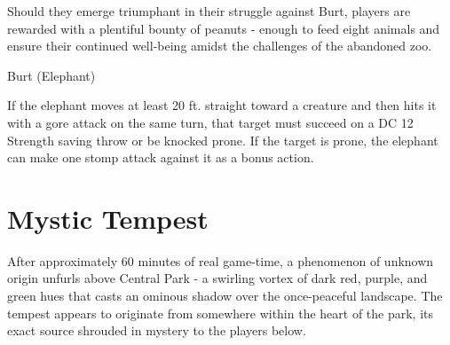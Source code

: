 Should they emerge triumphant in their struggle against Burt, players are rewarded with a plentiful bounty of peanuts - enough to feed eight animals and ensure their continued well-being amidst the challenges of the abandoned zoo.
\begin{DndMonster}[width=0.5\textwidth]{Burt (Elephant)}

	\DndMonsterBasics[
		armor-class = {15 (Natural Armor)},
		hit-points  = {\DndDice{10d12 + 30}},
		speed       = {40 ft.},
	]

	\renewcommand{\AbilityScoreSpacer}{~}

	\DndMonsterAbilityScores[
		str = 22,
		dex = 9,
		con = 17,
		int = 3,
		wis = 11,
		cha = 6,
	]

	\DndMonsterDetails[
		senses = {passive Perception 10},
		languages = {Common},
		challenge = 5,
	]

	If the elephant moves at least 20 ft. straight toward a creature and then hits it with a gore attack on the same turn, that target must succeed on a DC 12 Strength saving throw or be knocked prone. If the target is prone, the elephant can make one stomp attack against it as a bonus action.
	

	\DndMonsterAttack[
		name=Gore,
		distance=melee, %
		mod=+8,
		reach=5,
		targets=one target,
		dmg={\DndDice{3d8 + 6}},
		dmg-type=piercing,
	]
	
	\DndMonsterAttack[
		name=Stomp,
		distance=melee, %
		mod=+8,
		reach=5,
		targets=one prone target,
		dmg={\DndDice{3d10 + 6}},
		dmg-type=bludgeoning,
	]
\end{DndMonster}
\vfill\eject
\section*{Mystic Tempest}
After approximately 60 minutes of real game-time, a phenomenon of unknown origin unfurls above Central Park - a swirling vortex of dark red, purple, and green hues that casts an ominous shadow over the once-peaceful landscape. The tempest appears to originate from somewhere within the heart of the park, its exact source shrouded in mystery to the players below.

